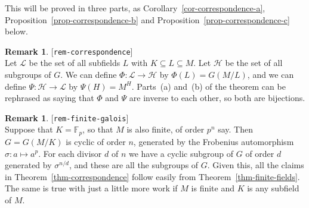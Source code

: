 \documentclass{amsart}
\newcommand{\lbl}[1]{\label{#1}\textup{[\texttt{#1}]}\ \\}
\newcommand{\lbl}{\label}
\newcommand{\F}         {{\mathbb{F}}}
\newcommand{\sg}        {\sigma}
\newcommand{\CH}        {{\mathcal{H}}}
\newcommand{\CL}        {{\mathcal{L}}}
\newcommand{\sse}       {\subseteq}
\renewcommand{\:}{\colon}
\theoremstyle{definition}
\newtheorem{remark}[theorem]{Remark}
\begin{document}
This will be proved in three parts, as
Corollary~\ref{cor-correspondence-a},
Proposition~\ref{prop-correspondence-b} and
Proposition~\ref{prop-correspondence-c} below.

\begin{remark}\lbl{rem-correspondence}
 Let $\CL$ be the set of all subfields $L$ with $K\sse L\sse M$.  Let
 $\CH$ be the set of all subgroups of $G$.  We can define
 $\Phi\:\CL\to\CH$ by $\Phi(L)=G(M/L)$, and we can define
 $\Psi\:\CH\to\CL$ by $\Psi(H)=M^H$.  Parts~(a) and~(b) of the theorem
 can be rephrased as saying that $\Phi$ and $\Psi$ are inverse to each
 other, so both are bijections.
\end{remark}

\begin{remark}\lbl{rem-finite-galois}
 Suppose that $K=\F_p$, so that $M$ is also finite, of order $p^n$
 say.  Then $G=G(M/K)$ is cyclic of order $n$, generated by the
 Frobenius automorphism $\sg\:a\mapsto a^p$.  For each divisor $d$ of
 $n$ we have a cyclic subgroup of $G$ of order $d$ generated by
 $\sg^{n/d}$, and these are all the subgroups of $G$.  Given this, all
 the claims in Theorem~\ref{thm-correspondence} follow easily from
 Theorem~\ref{thm-finite-fields}.  The same is true with just a little
 more work if $M$ is finite and $K$ is any subfield of $M$.
\end{remark}
\end{document}
